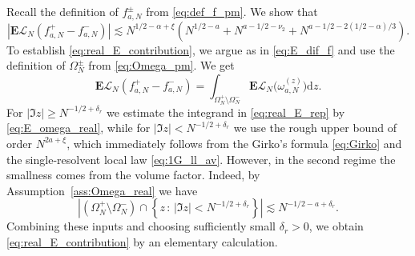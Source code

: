 \documentclass[10pt]{amsart}
\numberwithin{equation}{section}
\newcommand{\dif}{\mathrm{d}}
\newcommand{\E}{\mathbf{E}}
\begin{document}
Recall the definition of $f_{a,N}^\pm$ from \eqref{eq:def_f_pm}. We show that
\begin{equation}
\left\vert\E \mathcal{L}_N\left(f_{a,N}^+-f_{a,N}^-\right)\right\vert\lesssim N^{1/2-\alpha+\xi} \left( N^{1/2-a} + N^{a-1/2-\nu_2} + N^{a-1/2-2(1/2-\alpha)/3}\right).
\label{eq:real_E_contribution}
\end{equation}
To establish \eqref{eq:real_E_contribution}, we argue as in \eqref{eq:E_dif_f} and use the definition of $\Omega_N^\pm$ from \eqref{eq:Omega_pm}. We get
\begin{equation}
\E \mathcal{L}_N\left(f_{a,N}^+-f_{a,N}^-\right) = \int_{\Omega_N^+\setminus\Omega_N^-} \E\mathcal{L}_N\big(\omega_{a,N}^{(z)}\big) \dif z.
\label{eq:real_E_rep}
\end{equation}
For $|\Im z|\ge N^{-1/2+\delta_r}$ we estimate the integrand in \eqref{eq:real_E_rep} by \eqref{eq:E_omega_real}, while for $|\Im z|<N^{-1/2+\delta_r}$ we use the rough upper bound of order $N^{2a+\xi}$, which immediately follows from the Girko's formula \eqref{eq:Girko} and the single-resolvent local law \eqref{eq:1G_ll_av}. However, in the second regime the smallness comes from the volume factor. Indeed, by Assumption~\ref{ass:Omega_real} we have
\begin{equation*}
\left\vert \left(\Omega_N^+\setminus\Omega_N^-\right) \cap \left\lbrace z\,:\, |\Im z|<N^{-1/2+\delta_r}\right\rbrace\right\vert \lesssim N^{-1/2-a+\delta_r}.
\end{equation*}
Combining these inputs and choosing sufficiently small $\delta_r>0$, we obtain \eqref{eq:real_E_contribution} by an elementary calculation.
\end{document}
